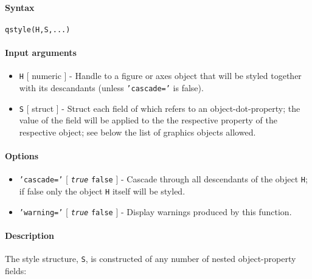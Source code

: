 


	\paragraph{Syntax}\label{syntax}

\begin{verbatim}
qstyle(H,S,...)
\end{verbatim}

\paragraph{Input arguments}\label{input-arguments}

\begin{itemize}
\item
  \texttt{H} {[} numeric {]} - Handle to a figure or axes object that
  will be styled together with its descandants (unless
  \texttt{'cascade='} is false).
\item
  \texttt{S} {[} struct {]} - Struct each field of which refers to an
  object-dot-property; the value of the field will be applied to the the
  respective property of the respective object; see below the list of
  graphics objects allowed.
\end{itemize}

\paragraph{Options}\label{options}

\begin{itemize}
\item
  \texttt{'cascade='} {[} \emph{\texttt{true}} \textbar{} \texttt{false}
  {]} - Cascade through all descendants of the object \texttt{H}; if
  false only the object \texttt{H} itself will be styled.
\item
  \texttt{'warning='} {[} \emph{\texttt{true}} \textbar{} \texttt{false}
  {]} - Display warnings produced by this function.
\end{itemize}

\paragraph{Description}\label{description}

The style structure, \texttt{S}, is constructed of any number of nested
object-property fields:

